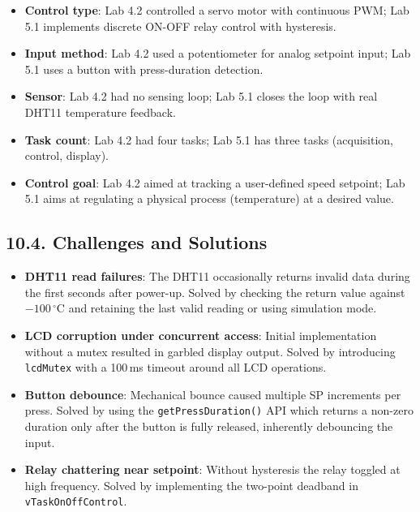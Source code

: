 \documentclass[12pt]{article}
\begin{document}
\begin{itemize}
    \item \textbf{Control type}: Lab 4.2 controlled a servo motor with continuous
          PWM; Lab 5.1 implements discrete ON-OFF relay control with hysteresis.
    \item \textbf{Input method}: Lab 4.2 used a potentiometer for analog setpoint
          input; Lab 5.1 uses a button with press-duration detection.
    \item \textbf{Sensor}: Lab 4.2 had no sensing loop; Lab 5.1 closes the loop
          with real DHT11 temperature feedback.
    \item \textbf{Task count}: Lab 4.2 had four tasks; Lab 5.1 has three tasks
          (acquisition, control, display).
    \item \textbf{Control goal}: Lab 4.2 aimed at tracking a user-defined speed
          setpoint; Lab 5.1 aims at regulating a physical process (temperature) at
          a desired value.
\end{itemize}

\subsection*{10.4. Challenges and Solutions}

\begin{itemize}
    \item \textbf{DHT11 read failures}: The DHT11 occasionally returns invalid
          data during the first seconds after power-up.  Solved by checking the
          return value against $-100\,^{\circ}$C and retaining the last valid
          reading or using simulation mode.
    \item \textbf{LCD corruption under concurrent access}: Initial implementation
          without a mutex resulted in garbled display output.  Solved by
          introducing \texttt{lcdMutex} with a 100\,ms timeout around all LCD
          operations.
    \item \textbf{Button debounce}: Mechanical bounce caused multiple SP
          increments per press.  Solved by using the \texttt{getPressDuration()}
          API which returns a non-zero duration only after the button is
          fully released, inherently debouncing the input.
    \item \textbf{Relay chattering near setpoint}: Without hysteresis the relay
          toggled at high frequency.  Solved by implementing the two-point
          deadband in \texttt{vTaskOnOffControl}.
\end{itemize}
\end{document}
